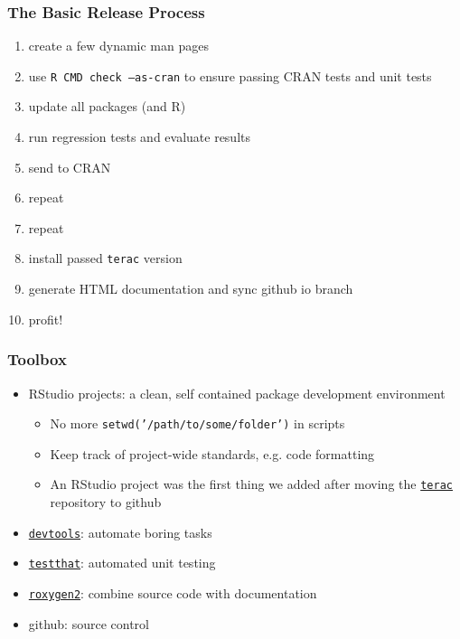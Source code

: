 \documentclass[12 pt]{beamer}\usepackage[]{graphicx}\usepackage[]{color}
\newcommand{\pkg}[1]{{\fontseries{b}\selectfont #1}}
\renewcommand{\pkg}[1]{{\color{darkgreen}\texttt{#1}}}
\begin{document}

  \begin{frame}[fragile]
\frametitle{The Basic Release Process}

\begin{enumerate}
  \item create a few dynamic man pages
  \item use {\color{darkred} \texttt{R CMD check --as-cran}} to ensure passing CRAN tests and {\color{darkred} unit tests}
  \item update all packages (and R)
  \item run {\color{darkred} regression tests} and evaluate results
  \item send to CRAN
  \item repeat
  \item repeat
  \item install passed \pkg{terac} version
  \item generate {\color{darkred} HTML documentation} and sync github io branch
  \item profit!
\end{enumerate}

\end{frame}



  \begin{frame}[fragile]
\frametitle{Toolbox}

\begin{itemize}
\item RStudio projects: a clean, self contained package development environment
  \begin{itemize}
  \item  No more {\tt setwd('/path/to/some/folder')} in scripts
  \item Keep track of project-wide standards, e.g. code formatting
  \item An RStudio project was the first thing we added after moving the \href{http://cran.r-project.org/web/packages/terac/index.html}{\pkg{terac}} repository to github
  \end{itemize}
\item \href{http://cran.r-project.org/web/packages/devtools/index.html}{\pkg{devtools}}: automate boring tasks
\item \href{http://cran.r-project.org/web/packages/testthat/index.html}{\pkg{testthat}}: automated unit testing
\item \href{http://cran.r-project.org/web/packages/roxygen2/index.html}{\pkg{roxygen2}}: combine source code with documentation
\item github: source control
\end{itemize}


\end{frame}
\end{document}
